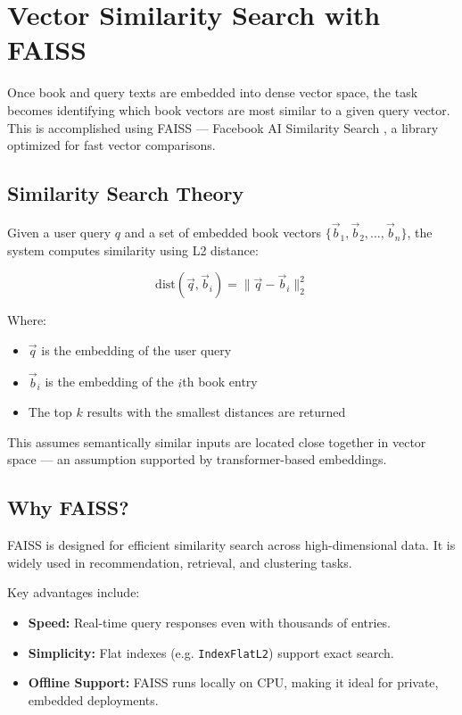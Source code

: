 \chapter{Vector Similarity Search with FAISS}
\label{chapter:similarity}

Once book and query texts are embedded into dense vector space, the task becomes identifying which book vectors are most similar to a given query vector. This is accomplished using FAISS — Facebook AI Similarity Search \cite{faiss}, a library optimized for fast vector comparisons.

\section{Similarity Search Theory}
\label{sec:similarity-theory}

Given a user query $q$ and a set of embedded book vectors $\{\vec{b}_1, \vec{b}_2, \dots, \vec{b}_n\}$, the system computes similarity using L2 distance:

\[
\text{dist}(\vec{q}, \vec{b}_i) = \|\vec{q} - \vec{b}_i\|_2^2
\]

Where:
\begin{itemize}
    \item $\vec{q}$ is the embedding of the user query
    \item $\vec{b}_i$ is the embedding of the $i$th book entry
    \item The top $k$ results with the smallest distances are returned
\end{itemize}

This assumes semantically similar inputs are located close together in vector space — an assumption supported by transformer-based embeddings.

\section{Why FAISS?}
\label{sec:faiss-choice}

FAISS is designed for efficient similarity search across high-dimensional data. It is widely used in recommendation, retrieval, and clustering tasks.

Key advantages include:

\begin{itemize}
    \item \textbf{Speed:} Real-time query responses even with thousands of entries.
    \item \textbf{Simplicity:} Flat indexes (e.g. \texttt{IndexFlatL2}) support exact search.
    \item \textbf{Offline Support:} FAISS runs locally on CPU, making it ideal for private, embedded deployments.
\end{itemize}

